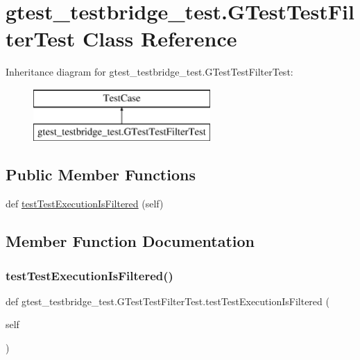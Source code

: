 \hypertarget{classgtest__testbridge__test_1_1GTestTestFilterTest}{}\section{gtest\+\_\+testbridge\+\_\+test.\+G\+Test\+Test\+Filter\+Test Class Reference}
\label{classgtest__testbridge__test_1_1GTestTestFilterTest}
Inheritance diagram for gtest\+\_\+testbridge\+\_\+test.\+G\+Test\+Test\+Filter\+Test\+:\begin{figure}[H]
\begin{center}
\leavevmode
\includegraphics[height=2.000000cm]{classgtest__testbridge__test_1_1GTestTestFilterTest}
\end{center}
\end{figure}
\subsection*{Public Member Functions}
\begin{DoxyCompactItemize}
\item 
def \mbox{\hyperlink{classgtest__testbridge__test_1_1GTestTestFilterTest_af41ae1fea4ec08f5594ad1ae78663d3c}{test\+Test\+Execution\+Is\+Filtered}} (self)
\end{DoxyCompactItemize}


\subsection{Member Function Documentation}
\mbox{\label{classgtest__testbridge__test_1_1GTestTestFilterTest_af41ae1fea4ec08f5594ad1ae78663d3c}} 
\subsubsection{\texorpdfstring{test\+Test\+Execution\+Is\+Filtered()}{testTestExecutionIsFiltered()}}
{\footnotesize\ttfamily def gtest\+\_\+testbridge\+\_\+test.\+G\+Test\+Test\+Filter\+Test.\+test\+Test\+Execution\+Is\+Filtered (\begin{DoxyParamCaption}\item[{}]{self }\end{DoxyParamCaption})}

